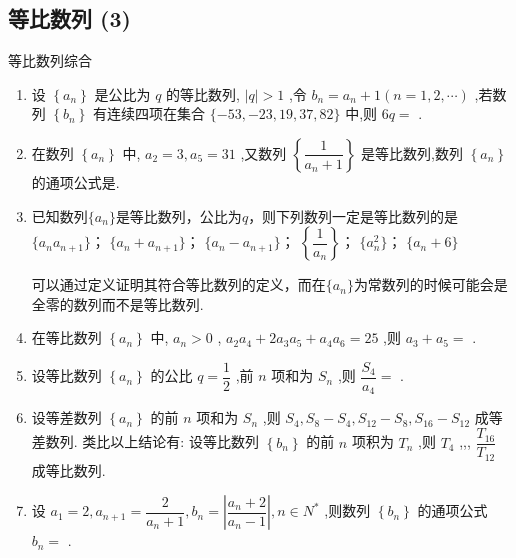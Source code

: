 \subsection*{等比数列 (3)}
\zsd 等比数列综合
\begin{enumerate}
    \item 设 $\left\{  {a}_{n}\right\}$ 是公比为 $q$ 的等比数列, $\left| q\right|  > 1$ ,令 ${b}_{n} = {a}_{n} + 1\left( {n = 1,2,\cdots }\right)$ ,若数列 $\left\{  {b}_{n}\right\}$ 有连续四项在集合 $\{  - {53}, - {23},{19},{37},{82}\}$ 中,则 ${6q} =$ .
    
    \item 在数列 $\left\{  {a}_{n}\right\}$ 中, ${a}_{2} = 3,{a}_{5} = {31}$ ,又数列 $\left\{  \dfrac{1}{{a}_{n} + 1}\right\}$ 是等比数列,数列 $\left\{  {a}_{n}\right\}$ 的通项公式是.

    \item 已知数列$\{a_n\}$是等比数列，公比为$q$，则下列数列一定是等比数列的是\\
     $\{a_n a_{n+1}\}$； $\{a_n+a_{n+1}\}$； $\{a_n-a_{n+1}\}$； $\left\{\dfrac{1}{a_n}\right\}$； $\{a_n^2\}$； $\{a_n + 6\}$
    \begin{jieda}
        可以通过定义证明其符合等比数列的定义，而在$\{a_n\}$为常数列的时候可能会是全零的数列而不是等比数列.
    \end{jieda}
    
    \item 在等比数列 $\left\{  {a}_{n}\right\}$ 中, ${a}_{n} > 0$ , ${a}_{2}{a}_{4} + 2{a}_{3}{a}_{5} + {a}_{4}{a}_{6} = {25}$ ,则 ${a}_{3} + {a}_{5} =$ .

    \item 设等比数列 $\left\{  {a}_{n}\right\}$ 的公比 $q = \dfrac{1}{2}$ ,前 $n$ 项和为 ${S}_{n}$ ,则 $\dfrac{{S}_{4}}{{a}_{4}} =$ .

    \item 设等差数列 $\left\{  {a}_{n}\right\}$ 的前 $n$ 项和为 ${S}_{n}$ ,则 ${S}_{4},{S}_{8} - {S}_{4},{S}_{12} - {S}_{8},{S}_{16} - {S}_{12}$ 成等差数列. 类比以上结论有: 设等比数列 $\left\{  {b}_{n}\right\}$ 的前 $n$ 项积为 ${T}_{n}$ ,则 ${T}_{4}$ ,,, $\dfrac{{T}_{16}}{{T}_{12}}$ 成等比数列.

    \item 设 ${a}_{1} = 2,{a}_{n + 1} = \dfrac{2}{{a}_{n} + 1},{b}_{n} = \left| \dfrac{{a}_{n} + 2}{{a}_{n} - 1}\right| ,n \in  {N}^{ * }$ ,则数列 $\left\{  {b}_{n}\right\}$ 的通项公式 ${b}_{n} =$ .


\end{enumerate}
